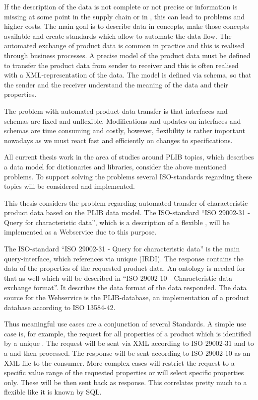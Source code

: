 If the description of the data is not complete or not precise or information is missing at some point in the supply chain or in  , this can lead to problems and higher costs.
The main goal is to describe data in concepts, make those concepts available and create standards which allow to automate the data flow. The automated exchange of product data is common in practice and this is realised through business processes. A precise model of the product data must be defined to transfer the product data from sender to receiver and this is often realised with a XML-representation of the data. The model is defined via schema, so that the sender and the receiver understand the meaning of the data and their properties. 

The problem with automated product data transfer is that interfaces and schemas are fixed and unflexible. Modifications and updates on interfaces and schemas are time consuming and costly, however, flexibility is rather important nowadays as we must react fast and efficiently on changes to specifications. 
 
All current thesis work in the area of studies around \gls{PLIB} topics, which describes a data model for dictionaries and libraries, consider the above mentioned problems. To support solving the problems several ISO-standards regarding these topics will be considered and implemented. 

This thesis considers the problem regarding automated transfer of characteristic product data based on the \gls{PLIB} data model. The ISO-standard \enquote{ISO 29002-31 - Query for characteristic data}, which is a description of a flexible , will be implemented as a \gls{Webservice} due to this purpose. 

The ISO-standard \enquote{ISO 29002-31 - Query for characteristic data} is the main query-interface, which references  via unique  (IRDI).
The response contains the data of the properties of the requested product data. An ontology is needed for that as well which will be described in \enquote{ISO 29002-10 - Characteristic data exchange format}. It describes the data format of the data responded. The data source for the \gls{Webservice} is the PLIB-database, an implementation of a product database according to ISO 13584-42. 

Thus meaningful use cases are a conjunction of several Standards. 
A simple use case is, for example, the request for all properties of a product which is identified by a unique . The request will be sent via XML according to ISO 29002-31 and to a  and then processed. The response will be sent according to ISO 29002-10 as an XML file to the consumer. More complex cases will restrict the request to a specific value range of the requested properties or will select specific properties only. These will be then sent back as response. This  correlates pretty much to a flexible  like it is known by SQL. 


